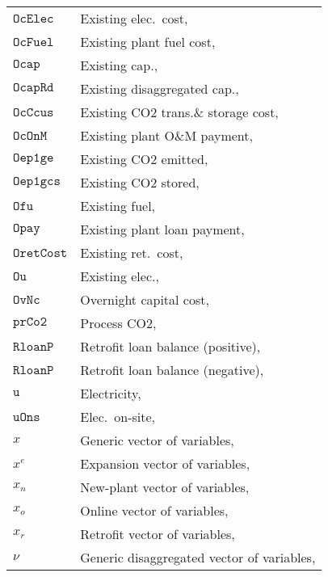 \documentclass{amsbook}
\begin{document}
\begin{longtable}[c]{@{}ll@{}}
    $\mathtt{OcElec}$ & Existing elec.\ cost, \\
    $\mathtt{OcFuel}$ & Existing plant fuel cost, \\
    $\mathtt{Ocap}$ & Existing cap., \\
    $\mathtt{OcapRd}$ & Existing disaggregated cap., \\
    $\mathtt{OcCcus}$ & Existing CO2 trans.\& storage cost, \\
    $\mathtt{OcOnM}$ & Existing plant O\&M payment, \\
    $\mathtt{Oep1ge}$ & Existing CO2 emitted, \\
    $\mathtt{Oep1gcs}$ & Existing CO2 stored, \\
    $\mathtt{Ofu}$ & Existing fuel, \\
    $\mathtt{Opay}$	& Existing plant loan payment, \\
    $\mathtt{OretCost}$	& Existing ret.\ cost, \\
    $\mathtt{Ou}$ & Existing elec., \\
    $\mathtt{OvNc}$	& Overnight capital cost, \\
    $\mathtt{prCo2}$	& Process CO2, \\
    $\mathtt{RloanP}$	& Retrofit loan balance (positive), \\
    $\mathtt{RloanP}$	& Retrofit loan balance (negative), \\
    $\mathtt{u}$	& Electricity, \\
    $\mathtt{uOns}$	& Elec.\ on-site, \\
    $x$	& Generic vector of variables, \\
    $x^e$	& Expansion vector of variables, \\
    $x_n$	& New-plant vector of variables, \\
    $x_o$	& Online vector of variables, \\
    $x_r$	& Retrofit vector of variables, \\
    $\nu$	& Generic disaggregated vector of variables, \\
 \end{longtable}
%
\end{document}
